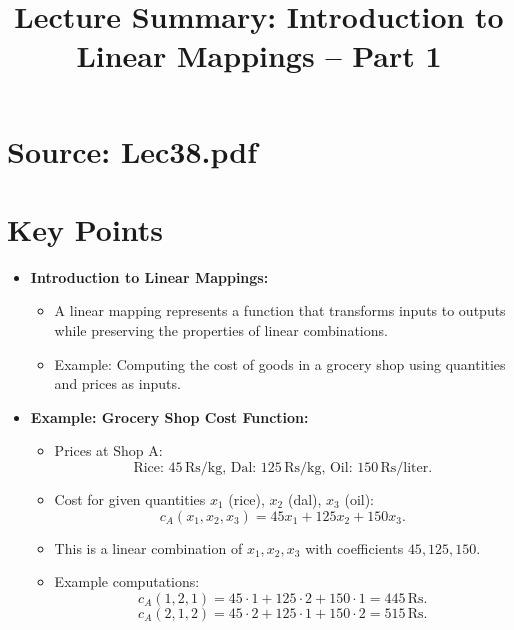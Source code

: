 \documentclass{article}
\title{Lecture Summary: Introduction to Linear Mappings – Part 1}
\author{}
\date{}
\begin{document}
\maketitle

\section*{Source: Lec38.pdf}

\section*{Key Points}

\begin{itemize}
  \item \textbf{Introduction to Linear Mappings:}
    \begin{itemize}
      \item A linear mapping represents a function that transforms inputs to outputs while preserving the properties of linear combinations.
      \item Example: Computing the cost of goods in a grocery shop using quantities and prices as inputs.
    \end{itemize}

  \item \textbf{Example: Grocery Shop Cost Function:}
    \begin{itemize}
      \item Prices at Shop A:
        \[
          \text{Rice: } 45 \, \text{Rs/kg}, \, \text{Dal: } 125 \, \text{Rs/kg}, \, \text{Oil: } 150 \, \text{Rs/liter}.
        \]
      \item Cost for given quantities $x_1$ (rice), $x_2$ (dal), $x_3$ (oil):
        \[
          c_A(x_1, x_2, x_3) = 45x_1 + 125x_2 + 150x_3.
        \]
      \item This is a linear combination of $x_1, x_2, x_3$ with coefficients $45, 125, 150$.
      \item Example computations:
        \[
          c_A(1, 2, 1) = 45 \cdot 1 + 125 \cdot 2 + 150 \cdot 1 = 445 \, \text{Rs}.
        \]
        \[
          c_A(2, 1, 2) = 45 \cdot 2 + 125 \cdot 1 + 150 \cdot 2 = 515 \, \text{Rs}.
        \]
    \end{itemize}


\end{itemize}
\end{document}
